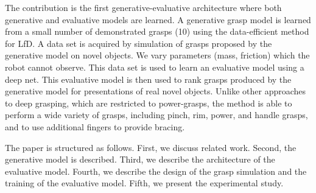 The contribution is the first generative-evaluative architecture where both generative and evaluative models are learned. A generative grasp model is learned from a small number of demonstrated grasps (10) using the data-efficient method for LfD. 
A data set is acquired by simulation of  grasps proposed by the generative model on novel objects. We vary parameters (mass, friction) which the robot cannot observe. This data set is used to learn an evaluative model using a deep net. This evaluative model is then used to rank grasps produced by the generative model for presentations of real novel objects. Unlike other approaches to deep grasping, which are restricted to power-grasps, the method is able to perform a wide variety of grasps, including pinch, rim, power, and handle grasps, and to use additional fingers to provide bracing.

The paper is structured as follows. First, we discuss related work. Second, the generative model is described. Third, we describe the architecture of the evaluative model. Fourth, we describe the design of the grasp simulation and the training of the evaluative model. Fifth, we present the experimental study.

